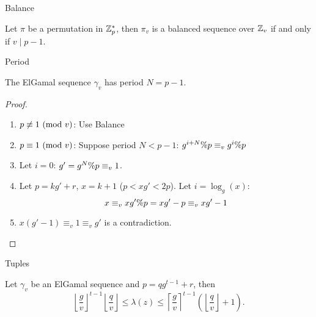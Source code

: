 
\begin{frame}{Balance}

\begin{proposition} \label{balancedproperty}
Let $\pi$ be a permutation in $\mathbb{Z}_p^*$, then $\pi_v$ is a balanced 
sequence over $\mathbb{Z}_v$ if and only if $v \mid p-1$.
\end{proposition}

  
\end{frame}

\begin{frame}{Period}

\begin{theorem}
The ElGamal sequence $\gamma_v$ has period $N = p-1$.
\end{theorem}

\begin{proof}
  \begin{enumerate}
  \item $p \not\equiv 1 \ (\mathrm{mod}\ v)$:  Use Balance
  \item $p \equiv 1 \ (\mathrm{mod}\ v)$: Suppose period $N < p-1$: $g^{i+N}\% p \equiv_v g^i \% p$ 
  \item Let $i=0$:  $g' = g^N\% p  \equiv_v 1$.
  \item Let $p = kg'+r$, $x = k+1$ ($p < xg' < 2p$). Let $i = \log_g(x)$:
    \[x \equiv_v xg'\% p = xg'-p \equiv_v xg' -1\]
  \item $x (g'-1) \equiv_v 1 \equiv_v g'$ is a contradiction.
\end{enumerate}
\end{proof}

  
\end{frame}

\begin{frame}{Tuples}

  
\begin{theorem}\label{elgamal_tuple}
  Let $\gamma_v$ be an ElGamal sequence and $p = q g^{t-1} + r$, then
  \[
     \left \lfloor \frac{g}{v} \right \rfloor^{t-1} 
     \left \lfloor\frac{q}{v} \right \rfloor 
\leq \lambda(z) 
\leq \left \lceil \frac{g}{v} \right \rceil^{t-1} 
     \left(\left \lfloor\frac{q}{v} \right\rfloor +1 \right).
  \]
\end{theorem}



  
\end{frame}

